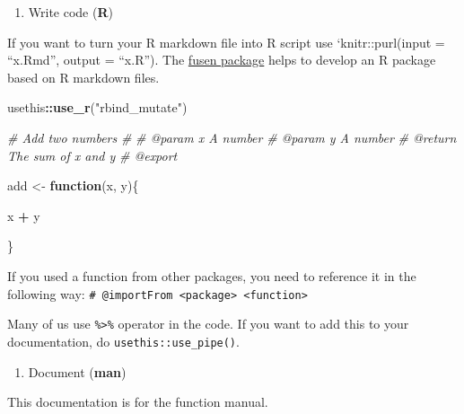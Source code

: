\documentclass[
]{book}
\newenvironment{Shaded}{\begin{snugshade}}{\end{snugshade}}
\newcommand{\CommentTok}[1]{\textcolor[rgb]{0.56,0.35,0.01}{\textit{#1}}}
\newcommand{\ControlFlowTok}[1]{\textcolor[rgb]{0.13,0.29,0.53}{\textbf{#1}}}
\newcommand{\FunctionTok}[1]{\textcolor[rgb]{0.13,0.29,0.53}{\textbf{#1}}}
\newcommand{\NormalTok}[1]{#1}
\newcommand{\OtherTok}[1]{\textcolor[rgb]{0.56,0.35,0.01}{#1}}
\newcommand{\SpecialCharTok}[1]{\textcolor[rgb]{0.81,0.36,0.00}{\textbf{#1}}}
\newcommand{\StringTok}[1]{\textcolor[rgb]{0.31,0.60,0.02}{#1}}
\providecommand{\tightlist}{%
  \setlength{\itemsep}{0pt}\setlength{\parskip}{0pt}}
\begin{document}
\begin{enumerate}
\def\labelenumi{\arabic{enumi}.}
\setcounter{enumi}{1}
\tightlist
\item
  Write code (\textbf{R})
\end{enumerate}

If you want to turn your R markdown file into R script use `knitr::purl(input = ``x.Rmd'',
output = ``x.R''). The \href{https://thinkr-open.github.io/fusen/}{fusen package} helps to develop an R package based on R markdown files.

\begin{Shaded}
\begin{Highlighting}[]
\NormalTok{usethis}\SpecialCharTok{::}\FunctionTok{use\_r}\NormalTok{(}\StringTok{"rbind\_mutate"}\NormalTok{)}
\end{Highlighting}
\end{Shaded}

\begin{Shaded}
\begin{Highlighting}[]
\CommentTok{\#\textquotesingle{} Add two numbers}
\CommentTok{\#\textquotesingle{}}
\CommentTok{\#\textquotesingle{} @param x A number}
\CommentTok{\#\textquotesingle{} @param y A number}
\CommentTok{\#\textquotesingle{} @return The sum of x and y }
\CommentTok{\#\textquotesingle{} @export}

\NormalTok{add }\OtherTok{\textless{}{-}} \ControlFlowTok{function}\NormalTok{(x, y)\{}
  
\NormalTok{  x }\SpecialCharTok{+}\NormalTok{ y}
  
\NormalTok{\}}
\end{Highlighting}
\end{Shaded}

If you used a function from other packages, you need to reference it in the following way: \texttt{\#\textquotesingle{}\ @importFrom\ \textless{}package\textgreater{}\ \textless{}function\textgreater{}}

Many of us use \texttt{\%\textgreater{}\%} operator in the code. If you want to add this to your documentation, do \texttt{usethis::use\_pipe()}.

\begin{enumerate}
\def\labelenumi{\arabic{enumi}.}
\setcounter{enumi}{2}
\tightlist
\item
  Document (\textbf{man})
\end{enumerate}

This documentation is for the function manual.
\end{document}
